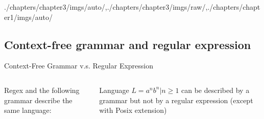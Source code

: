 \begin{graphicspathcontext}{{./chapters/chapter3/imgs/auto/},{./chapters/chapter3/imgs/raw/},{./chapters/chapter1/imgs/auto/}}
\begin{bibunit}[apalike]
\subsection{Context-free grammar and regular expression}
\subsectiontableofcontentslide

\begin{frame}[t]{{Context-Free Grammar} v.s. Regular Expression}
	\vspace{-.5cm}
	\begin{columns}
		\begin{column}[t]{.5\linewidth}
			\begin{example}
				Regex  and the following grammar describe the same language:
				\begin{small}
					\begin{bnf}
						 \\
						 \\
						 \\
						 \\
						 \\
					\end{bnf}
				\end{small}
			\end{example}
		\end{column}
		\begin{column}[t]{.5\linewidth}
			\begin{example}
				Language $L = { a^nb^n | n \ge 1 }$ can be described by a grammar but not by a regular expression (except with Posix extension)
			\end{example}
		\end{column}
	\end{columns}
\end{frame}


\end{bibunit}
\end{graphicspathcontext}
